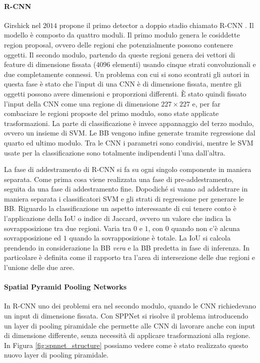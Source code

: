 \paragraph{R-CNN} 
Girshick nel $2014$ propone il primo detector a doppio stadio chiamato R-CNN \cite{girshick2014rich}. Il modello è composto da quattro moduli. Il primo modulo genera le cosiddette region proposal, ovvero delle regioni che potenzialmente possono contenere oggetti. Il secondo modulo, partendo da queste regioni genera dei vettori di feature di dimensione fissata ($4096$ elementi) usando cinque strati convoluzionali e due completamente connessi. Un problema con cui si sono scontrati gli autori in questa fase è stato che l'input di una \ac{CNN} è di dimensione fissata, mentre gli oggetti possono avere dimensioni e proporzioni differenti. È stato quindi fissato l'input della \ac{CNN} come una regione di dimensione $227 \times 227$ e, per far combaciare le regioni proposte del primo modulo, sono state applicate trasformazioni.
La parte di classificazione è invece appannaggio del terzo modulo, ovvero  un insieme di \ac{SVM}. Le \ac{BB} vengono infine generate tramite regressione dal quarto ed ultimo modulo. Tra le \ac{CNN} i parametri sono condivisi, mentre le \ac{SVM} usate per la classificazione sono totalmente indipendenti l'una dall'altra.

La fase di addestramento di R-CNN si fa su ogni singolo componente in maniera separata. Come prima cosa viene realizzata una fase di pre-addestramento, seguita da una fase di addestramento fine. Dopodiché si vanno ad addestrare in maniera separata i classificatori \ac{SVM} e gli strati di regressione per generare le \ac{BB}.
Riguardo la classificazione un aspetto interessante di cui tenere conto è l'applicazione della \ac{IoU} o indice di Jaccard, ovvero un valore che indica la sovrapposizione tra due regioni. Varia tra $0$ e $1$, con $0$ quando non c'è alcuna sovrapposizione ed $1$ quando la sovrapposizione è totale. La \ac{IoU} si calcola prendendo in considerazione la \ac{BB} \textit{vera} e la \ac{BB} predetta in fase di inferenza. In particolare è definita come il rapporto tra l'area di intersezione delle due regioni e l'unione delle due aree. 

\paragraph{Spatial Pyramid Pooling Networks} In R-CNN uno dei problemi era nel secondo modulo, quando le \ac{CNN} richiedevano un input di dimensione fissata. Con \ac{SPPNet} \cite{he2015spatial} si risolve il problema introducendo un layer di pooling piramidale che permette alle \ac{CNN} di lavorare anche con input di dimensione differente, senza necessità di applicare trasformazioni alla regione. In Figura \ref{fig:spnnet_structure} possiamo vedere come è stato realizzato questo nuovo layer di pooling piramidale. 

